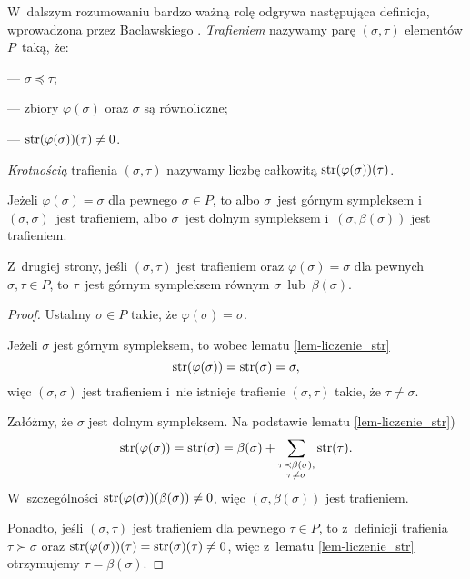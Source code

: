W~dalszym rozumowaniu bardzo ważną rolę odgrywa następująca definicja, wprowadzona przez Baclawskiego \cite[Definition 28]{Baclawski12}. \textit{Trafieniem} nazywamy parę $(\sigma,\tau)$ elementów $P$~taką, że:
\begin{compactitem}
\item[---] $\sigma\preceq\tau$;
\item[---] zbiory $\varphi(\sigma)$ oraz $\sigma$ są równoliczne;
\item[---] $\operatorname{str}(\varphi(\sigma))(\tau)\not=0$.
\end{compactitem}
\textit{Krotnością} trafienia $(\sigma,\tau)$ nazywamy liczbę całkowitą $\operatorname{str}(\varphi(\sigma))(\tau)$.

\begin{lem}\label{lem-jak_wyglada_hit_od_sympleksu_stalego}
Jeżeli $\varphi(\sigma)=\sigma$ dla pewnego $\sigma\in P$, to albo $\sigma$~jest górnym sympleksem i~$(\sigma,\sigma)$~jest trafieniem, albo $\sigma$~jest dolnym sympleksem i~$(\sigma,\beta(\sigma))$ jest trafieniem.

Z~drugiej strony, jeśli $(\sigma,\tau)$ jest trafieniem oraz $\varphi(\sigma)=\sigma$ dla pewnych $\sigma,\tau\in P$, to $\tau$~jest górnym sympleksem równym $\sigma$~lub~$\beta(\sigma)$. 
\end{lem}
\begin{proof}
Ustalmy $\sigma\in P$ takie, że $\varphi(\sigma)=\sigma$. 

Jeżeli $\sigma$ jest górnym sympleksem, to wobec lematu \ref{lem-liczenie_str}
 \[\operatorname{str}(\varphi(\sigma))=\operatorname{str}(\sigma)=\sigma,\] więc $(\sigma,\sigma)$ jest trafieniem i~nie istnieje trafienie $(\sigma,\tau)$ takie, że $\tau\not=\sigma$. 

Załóżmy, że $\sigma$ jest dolnym sympleksem. Na podstawie lematu \ref{lem-liczenie_str})
 \[\operatorname{str}(\varphi(\sigma))=\operatorname{str}(\sigma)=\beta(\sigma) + \sum_{\substack{\tau\prec\beta(\sigma),\\ \tau\not=\sigma}}\operatorname{str}(\tau).\] W~szczególności $\operatorname{str}(\varphi(\sigma))(\beta(\sigma))\not=0$, więc $(\sigma,\beta(\sigma))$ jest trafieniem. 

Ponadto, jeśli $(\sigma,\tau)$ jest trafieniem dla pewnego $\tau\in P$, to z~definicji trafienia $\tau\succ \sigma$ oraz $\operatorname{str}(\varphi(\sigma))(\tau)=\operatorname{str}(\sigma)(\tau)\not=0$, więc z~lematu \ref{lem-liczenie_str} otrzymujemy $\tau=\beta(\sigma)$.
\end{proof}

